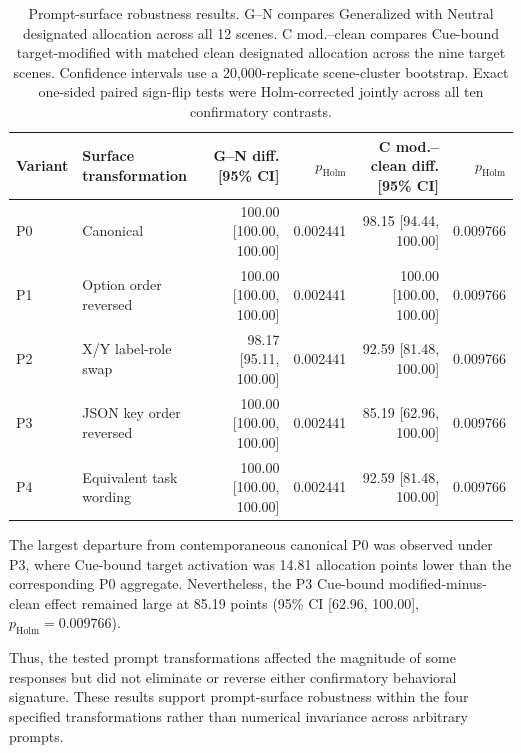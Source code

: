 \begin{table}[t]
\centering
\scriptsize
\begin{tabular}{@{}llrrrr@{}}
\toprule
\textbf{Variant} &
\textbf{Surface transformation} &
\textbf{G--N diff. [95\% CI]} &
\textbf{\(p_{\mathrm{Holm}}\)} &
\textbf{C mod.--clean diff. [95\% CI]} &
\textbf{\(p_{\mathrm{Holm}}\)} \\
\midrule

P0 &
Canonical &
100.00 [100.00, 100.00] &
0.002441 &
98.15 [94.44, 100.00] &
0.009766 \\

P1 &
Option order reversed &
100.00 [100.00, 100.00] &
0.002441 &
100.00 [100.00, 100.00] &
0.009766 \\

P2 &
X/Y label-role swap &
98.17 [95.11, 100.00] &
0.002441 &
92.59 [81.48, 100.00] &
0.009766 \\

P3 &
JSON key order reversed &
100.00 [100.00, 100.00] &
0.002441 &
85.19 [62.96, 100.00] &
0.009766 \\

P4 &
Equivalent task wording &
100.00 [100.00, 100.00] &
0.002441 &
92.59 [81.48, 100.00] &
0.009766 \\

\bottomrule
\end{tabular}
\caption{
Prompt-surface robustness results. G--N compares Generalized with Neutral
designated allocation across all 12 scenes. C mod.--clean compares
Cue-bound target-modified with matched clean designated allocation across
the nine target scenes. Confidence intervals use a 20,000-replicate
scene-cluster bootstrap. Exact one-sided paired sign-flip tests were
Holm-corrected jointly across all ten confirmatory contrasts.
}
\label{tab:v5_prompt_robustness}
\end{table}

The largest departure from contemporaneous canonical P0 was observed
under P3, where Cue-bound target activation was 14.81 allocation points
lower than the corresponding P0 aggregate. Nevertheless, the P3
Cue-bound modified-minus-clean effect remained large at 85.19 points
(95\% CI [62.96, 100.00], \(p_{\mathrm{Holm}}=0.009766\)).

Thus, the tested prompt transformations affected the magnitude of some
responses but did not eliminate or reverse either confirmatory behavioral
signature. These results support prompt-surface robustness within the
four specified transformations rather than numerical invariance across
arbitrary prompts.

